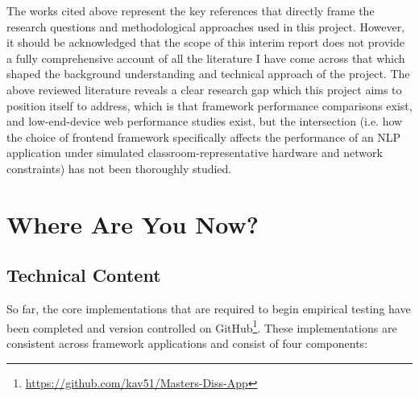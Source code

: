 \documentclass[conference]{IEEEtran}
\begin{document}
The works cited above represent the key references that directly frame the research questions and methodological approaches used in this project. However, it should be acknowledged that the scope of this interim report does not provide a fully comprehensive account of all the literature I have come across that which shaped the background understanding and technical approach of the project. The above reviewed literature reveals a clear research gap which this project aims to position itself to address, which is that framework performance comparisons exist, and low-end-device web performance studies exist, but the intersection (i.e. how the choice of frontend framework specifically affects the performance of an NLP application under simulated classroom-representative hardware and network constraints) has not been thoroughly studied.

\section{Where Are You Now?}

\subsection{Technical Content}

So far, the core implementations that are required to begin empirical testing have been completed and version controlled on GitHub\footnote{\url{https://github.com/kav51/Masters-Diss-App}}. These implementations are consistent across framework applications and consist of four components:

\medskip
\end{document}
